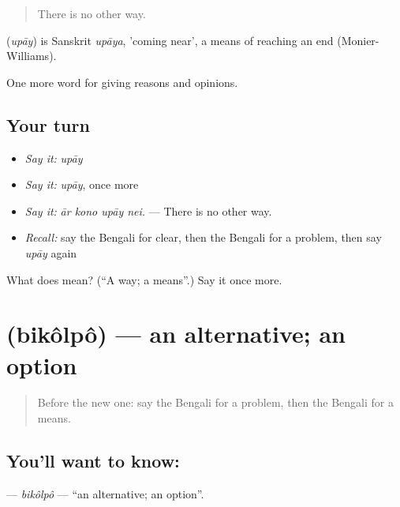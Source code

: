 \begin{quote}
There is no other way.
\end{quote}

\begin{cousinweb}
\textbf{} (\emph{upāy}) is Sanskrit \emph{upāya}, 'coming near', a means of reaching an end (Monier-Williams).
\end{cousinweb}

\begin{grammarlens}[title={What you've built}]
One more word for giving reasons and opinions.
\end{grammarlens}

\subsection*{Your turn}
\begin{itemize}
\raggedright
  \item \emph{Say it:} \emph{upāy}
  \item \emph{Say it:} \emph{upāy}, once more
  \item \emph{Say it:} \emph{ār kono upāy nei.} — There is no other way.
  \item \emph{Recall:} say the Bengali for clear, then the Bengali for a problem, then say \emph{upāy} again
\end{itemize}

\begin{tcolorbox}[breakable,colback=teal!4,colframe=teal!35!black,title={Before you move on}]
What does  mean? (\textquotedblleft{}A way; a means\textquotedblright{}.) Say it once more.
\end{tcolorbox}
\section[\texorpdfstring{\bn{বিকল্প} (bikôlpô)}{বিকল্প (bikôlpô)}]{ (bikôlpô) — an alternative; an option}

\label{lesson:BN-C363-bikolpo}



\begin{quote}
Before the new one: say the Bengali for a problem, then the Bengali for a means.
\end{quote}

\subsection*{You'll want to know: }
\textbf{} — \emph{bikôlpô} — \textquotedblleft{}an alternative; an option\textquotedblright{}.

